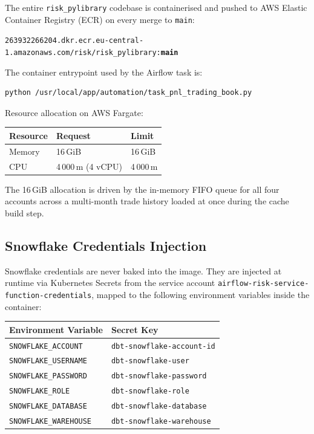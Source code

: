 \documentclass[11pt, a4paper]{article}
\begin{document}
The entire \texttt{risk\_pylibrary} codebase is containerised and
pushed to AWS Elastic Container Registry (ECR) on every merge to
\texttt{main}:

\begin{mdframed}[backgroundcolor=TR_GRAY, linecolor=TR_BLUE,
                 linewidth=1pt, roundcorner=4pt]
\texttt{263932266204.dkr.ecr.eu-central-1.amazonaws.com/risk/risk\_pylibrary:\textbf{main}}
\end{mdframed}

\medskip
The container entrypoint used by the Airflow task is:

\begin{lstlisting}[style=pycode]
python /usr/local/app/automation/task_pnl_trading_book.py
\end{lstlisting}

Resource allocation on AWS Fargate:

\begin{center}
\begin{tabular}{@{}lll@{}}
  \toprule
  Resource & Request & Limit \\
  \midrule
  Memory & 16\,GiB & 16\,GiB \\
  CPU    & 4\,000\,m (4 vCPU) & 4\,000\,m \\
  \bottomrule
\end{tabular}
\end{center}

The 16\,GiB allocation is driven by the in-memory FIFO queue for
all four accounts across a multi-month trade history loaded at
once during the cache build step.

\subsection{Snowflake Credentials Injection}

Snowflake credentials are never baked into the image.
They are injected at runtime via Kubernetes Secrets from the
service account \texttt{airflow-risk-service-function-credentials},
mapped to the following environment variables inside the container:

\begin{center}
\begin{tabular}{@{}ll@{}}
  \toprule
  Environment Variable      & Secret Key \\
  \midrule
  \texttt{SNOWFLAKE\_ACCOUNT}   & \texttt{dbt-snowflake-account-id} \\
  \texttt{SNOWFLAKE\_USERNAME}  & \texttt{dbt-snowflake-user} \\
  \texttt{SNOWFLAKE\_PASSWORD}  & \texttt{dbt-snowflake-password} \\
  \texttt{SNOWFLAKE\_ROLE}      & \texttt{dbt-snowflake-role} \\
  \texttt{SNOWFLAKE\_DATABASE}  & \texttt{dbt-snowflake-database} \\
  \texttt{SNOWFLAKE\_WAREHOUSE} & \texttt{dbt-snowflake-warehouse} \\
  \bottomrule
\end{tabular}
\end{center}
\end{document}

